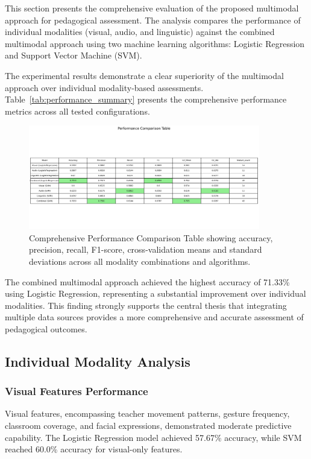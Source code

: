 This section presents the comprehensive evaluation of the proposed multimodal approach for pedagogical assessment. The analysis compares the performance of individual modalities (visual, audio, and linguistic) against the combined multimodal approach using two machine learning algorithms: Logistic Regression and Support Vector Machine (SVM).

The experimental results demonstrate a clear superiority of the multimodal approach over individual modality-based assessments. Table~\ref{tab:performance_summary} presents the comprehensive performance metrics across all tested configurations.

\begin{figure}[H]
    \centering
    \includegraphics[width=0.9\textwidth]{sections/performance_table.jpg}
    \caption{Comprehensive Performance Comparison Table showing accuracy, precision, recall, F1-score, cross-validation means and standard deviations across all modality combinations and algorithms.}
    \label{fig:performance_table}
\end{figure}

The combined multimodal approach achieved the highest accuracy of 71.33\% using Logistic Regression, representing a substantial improvement over individual modalities. This finding strongly supports the central thesis that integrating multiple data sources provides a more comprehensive and accurate assessment of pedagogical outcomes.

\subsection{Individual Modality Analysis}

\subsubsection{Visual Features Performance}

Visual features, encompassing teacher movement patterns, gesture frequency, classroom coverage, and facial expressions, demonstrated moderate predictive capability. The Logistic Regression model achieved 57.67\% accuracy, while SVM reached 60.0\% accuracy for visual-only features.

